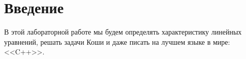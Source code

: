 \section{Введение}
    В этой лабораторной работе мы будем определять характеристику линейных уравнений, решать задачи Коши и даже писать на лучшем языке в мире: <<C++>>.